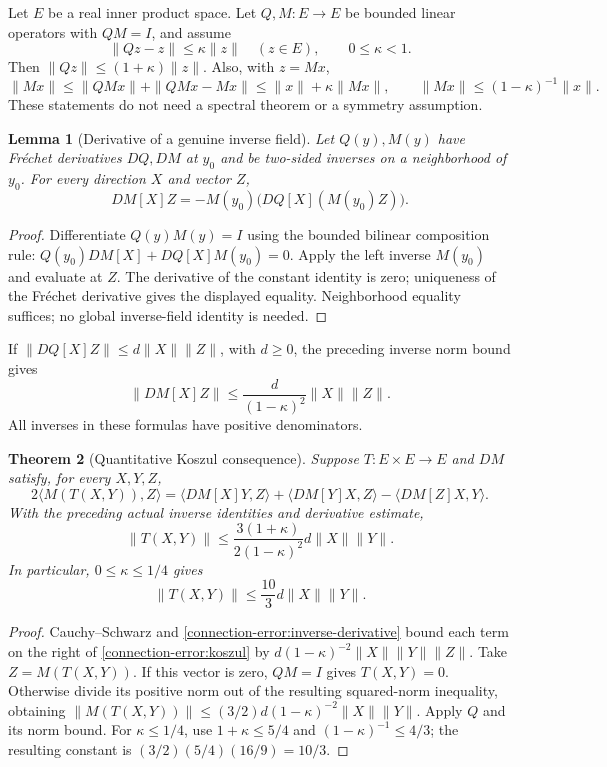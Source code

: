 \documentclass[11pt]{article}
\newtheorem{theorem}{Theorem}[section]
\newtheorem{lemma}[theorem]{Lemma}
\theoremstyle{definition}
\theoremstyle{remark}
\numberwithin{equation}{section}
\begin{document}
Let $E$ be a real inner product space. Let $Q,M:E\to E$ be bounded linear
operators with $QM=I$, and assume
\[
 \|Qz-z\|\le\kappa\|z\|\quad(z\in E),\qquad 0\le\kappa<1.
\]
Then $\|Qz\|\le(1+\kappa)\|z\|$. Also, with $z=Mx$,
\[
 \|Mx\|\le\|QMx\|+\|QMx-Mx\|
          \le\|x\|+\kappa\|Mx\|,
 \qquad\|Mx\|\le(1-\kappa)^{-1}\|x\|.
\]
These statements do not need a spectral theorem or a symmetry assumption.

\begin{lemma}[Derivative of a genuine inverse field]
Let $Q(y),M(y)$ have Fr\'echet derivatives $DQ,DM$ at $y_0$ and be
two-sided inverses on a neighborhood of $y_0$. For every direction $X$
and vector $Z$,
\[
 DM[X]Z=-M(y_0)\big(DQ[X](M(y_0)Z)\big).
\]
\end{lemma}
\begin{proof}
Differentiate $Q(y)M(y)=I$ using the bounded bilinear composition rule:
$Q(y_0)DM[X]+DQ[X]M(y_0)=0$. Apply the left inverse $M(y_0)$ and
evaluate at $Z$. The derivative of the constant identity is zero; uniqueness
of the Fr\'echet derivative gives the displayed equality. Neighborhood
equality suffices; no global inverse-field identity is needed.
\end{proof}
If $\|DQ[X]Z\|\le d\|X\|\|Z\|$, with $d\ge0$, the preceding
inverse norm bound gives
\begin{equation}\label{connection-error:inverse-derivative}
 \|DM[X]Z\|\le\frac{d}{(1-\kappa)^2}\|X\|\|Z\|.
\end{equation}
All inverses in these formulas have positive denominators.

\begin{theorem}[Quantitative Koszul consequence]
Suppose $T:E\times E\to E$ and $DM$ satisfy, for every $X,Y,Z$,
\begin{equation}\label{connection-error:koszul}
 2\langle M(T(X,Y)),Z\rangle
 =\langle DM[X]Y,Z\rangle+\langle DM[Y]X,Z\rangle
                         -\langle DM[Z]X,Y\rangle.
\end{equation}
With the preceding actual inverse identities and derivative estimate,
\[
 \|T(X,Y)\|\le\frac{3(1+\kappa)}{2(1-\kappa)^2}
                  d\|X\|\|Y\|.
\]
In particular, $0\le\kappa\le1/4$ gives
\begin{equation}\label{connection-error:bound}
 \|T(X,Y)\|\le\frac{10}{3}d\|X\|\|Y\|.
\end{equation}
\end{theorem}
\begin{proof}
Cauchy--Schwarz and \eqref{connection-error:inverse-derivative} bound
each term on the right of \eqref{connection-error:koszul} by
$d(1-\kappa)^{-2}\|X\|\|Y\|\|Z\|$. Take
$Z=M(T(X,Y))$. If this vector is zero, $QM=I$ gives $T(X,Y)=0$.
Otherwise divide its positive norm out of the resulting squared-norm
inequality, obtaining
$\|M(T(X,Y))\|\le(3/2)d(1-\kappa)^{-2}\|X\|\|Y\|$.
Apply $Q$ and its norm bound. For $\kappa\le1/4$, use
$1+\kappa\le5/4$ and $(1-\kappa)^{-1}\le4/3$; the resulting constant
is $(3/2)(5/4)(16/9)=10/3$.
\end{proof}
\end{document}
